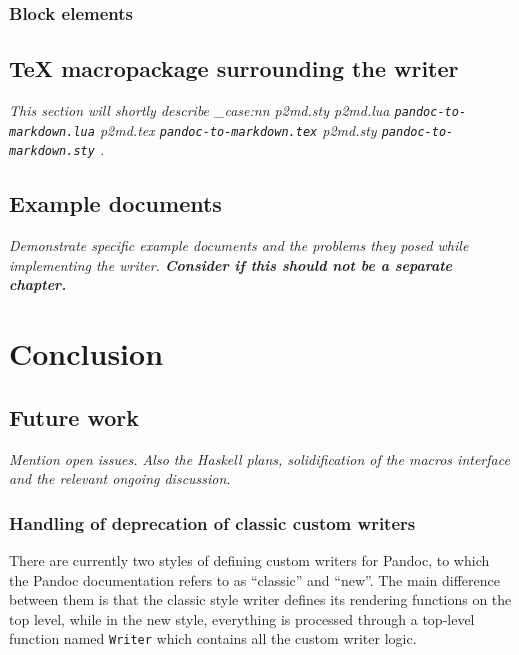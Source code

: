 \documentclass[
  digital,     %
  oneside,     %
  nosansbold,  %
  nocolorbold, %
  lof,         %
  lot,         %
]{fithesis4}
\newcommand\file[1]
  {
    \str_case:nn
      { #1 }
      {
        { p2md.lua } { \texttt{pandoc\hyp{}to\hyp{}markdown.lua} }
        { p2md.tex } { \texttt{pandoc\hyp{}to\hyp{}markdown.tex} }
        { p2md.sty } { \texttt{pandoc\hyp{}to\hyp{}markdown.sty} }
      }
  }
\begin{document}
\subsection{Block elements}

\section{\TeX{} macropackage surrounding the writer}
\emph{This section will shortly describe \file{p2md.sty}.}

\section{Example documents}
\emph{Demonstrate specific example documents and the problems they posed while implementing the writer. \label{fig:html-browsers-typeset} \textbf{Consider if this should not be a separate chapter.}}

% 


\chapter{Conclusion}
\section{Future work}
\emph{Mention open issues. Also the Haskell plans, solidification of the macros interface and the relevant ongoing discussion.}

\subsection{Handling of deprecation of classic custom writers}

There are currently two styles of defining custom writers for Pandoc, to which the Pandoc documentation refers to as ``classic'' and ``new''. The main difference between them is that the classic style writer defines its rendering functions on the top level, while in the new style, everything is processed through a top-level function named \texttt{Writer} which contains all the custom writer logic.
\end{document}
